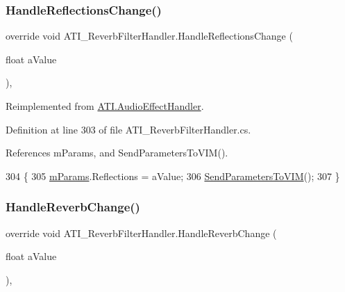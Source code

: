 \subsubsection{\texorpdfstring{Handle\+Reflections\+Change()}{HandleReflectionsChange()}}
{\footnotesize\ttfamily override void A\+T\+I\+\_\+\+Reverb\+Filter\+Handler.\+Handle\+Reflections\+Change (\begin{DoxyParamCaption}\item[{float}]{a\+Value }\end{DoxyParamCaption})\hspace{0.3cm}{\ttfamily [protected]}, {\ttfamily [virtual]}}



Reimplemented from \hyperlink{class_a_t_i_1_1_audio_effect_handler_af50ba52dba236a3b711172fd6bbc1bab}{A\+T\+I.\+Audio\+Effect\+Handler}.



Definition at line 303 of file A\+T\+I\+\_\+\+Reverb\+Filter\+Handler.\+cs.



References m\+Params, and Send\+Parameters\+To\+V\+I\+M().


\begin{DoxyCode}
304     \{
305         \hyperlink{class_a_t_i___reverb_filter_handler_a034260fbce2052b42bceddc891632347}{mParams}.Reflections = aValue;
306         \hyperlink{class_a_t_i___reverb_filter_handler_aacb469dc3038fca616d638f6a5a04a30}{SendParametersToVIM}();
307     \}
\end{DoxyCode}
\mbox{\label{class_a_t_i___reverb_filter_handler_ae228f1d67c8efd950a3b2c594d5dd9f8}} 
\subsubsection{\texorpdfstring{Handle\+Reverb\+Change()}{HandleReverbChange()}}
{\footnotesize\ttfamily override void A\+T\+I\+\_\+\+Reverb\+Filter\+Handler.\+Handle\+Reverb\+Change (\begin{DoxyParamCaption}\item[{float}]{a\+Value }\end{DoxyParamCaption})\hspace{0.3cm}{\ttfamily [protected]}, {\ttfamily [virtual]}}




